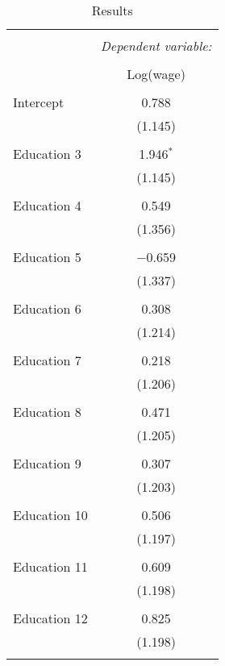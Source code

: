 
\begin{table}[!htbp] \centering 
  \caption{Results} 
  \label{tab:question-5-a} 
\begin{tabular}{@{\extracolsep{5pt}}lc} 
\\[-1.8ex]\hline 
\hline \\[-1.8ex] 
 & \multicolumn{1}{c}{\textit{Dependent variable:}} \\ 
\cline{2-2} 
\\[-1.8ex] & Log(wage) \\ 
\hline \\[-1.8ex] 
 Intercept & 0.788 \\ 
  & (1.145) \\ 
  & \\ 
 Education 3 & 1.946$^{*}$ \\ 
  & (1.145) \\ 
  & \\ 
 Education 4 & 0.549 \\ 
  & (1.356) \\ 
  & \\ 
 Education 5 & $-$0.659 \\ 
  & (1.337) \\ 
  & \\ 
 Education 6 & 0.308 \\ 
  & (1.214) \\ 
  & \\ 
 Education 7 & 0.218 \\ 
  & (1.206) \\ 
  & \\ 
 Education 8 & 0.471 \\ 
  & (1.205) \\ 
  & \\ 
 Education 9 & 0.307 \\ 
  & (1.203) \\ 
  & \\ 
 Education 10 & 0.506 \\ 
  & (1.197) \\ 
  & \\ 
 Education 11 & 0.609 \\ 
  & (1.198) \\ 
  & \\ 
 Education 12 & 0.825 \\ 
  & (1.198) \\ 
  & \\ 

\end{tabular}
\end{table}
